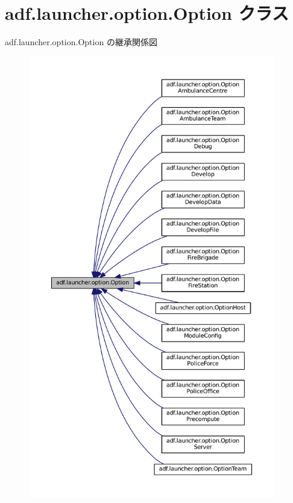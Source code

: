 \hypertarget{classadf_1_1launcher_1_1option_1_1Option}{}\section{adf.\+launcher.\+option.\+Option クラス}
\label{classadf_1_1launcher_1_1option_1_1Option}


adf.\+launcher.\+option.\+Option の継承関係図
\nopagebreak
\begin{figure}[H]
\begin{center}
\leavevmode
\includegraphics[height=550pt]{classadf_1_1launcher_1_1option_1_1Option__inherit__graph}
\end{center}
\end{figure}
